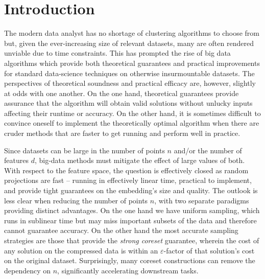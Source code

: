 \section{Introduction}

The modern data analyst has no shortage of clustering algorithms to choose from but, given the ever-increasing size of relevant datasets, many are often
rendered unviable due to time constraints.  This has prompted the rise of big data algorithms which provide both theoretical guarantees and
practical improvements for standard data-science techniques on otherwise insurmountable datasets. The perspectives
of theoretical soundness and practical efficacy are, however, slightly at odds with one another. On the one hand, theoretical guarantees provide assurance that
the algorithm will obtain valid solutions without unlucky inputs affecting their runtime or accuracy. On the other hand, it is sometimes difficult to convince
oneself to implement the theoretically optimal algorithm when there are cruder methods that are faster to get running and perform well in practice.

Since datasets can be large in the number of points $n$ and/or the number of features $d$, big-data methods must mitigate the effect of large values of both.
With respect to the feature space, the question is effectively closed as random projections are fast -- running in effectively linear time, practical to
implement, and provide tight guarantees on the embedding's size and quality. The outlook is less clear when reducing the number of points $n$, with
two separate paradigms providing distinct advantages.  On the one hand we have uniform sampling, which runs in sublinear time but may miss important subsets of
the data and therefore cannot guarantee accuracy.  On the other hand the most accurate sampling strategies are those that provide the \emph{strong coreset}
guarantee, wherein the cost of any solution on the compressed data is within an $\varepsilon$-factor of that solution's cost on the original dataset.
Surprisingly, many coreset constructions can remove the dependency on $n$, significantly accelerating downstream tasks.

